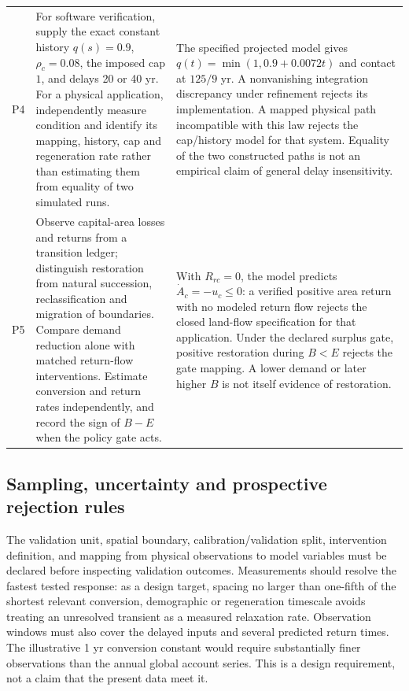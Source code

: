 \documentclass[11pt,a4paper]{article}
\begin{document}
\begin{longtable}{>{\raggedright\arraybackslash}p{}>{\raggedright\arraybackslash}p{}>{\raggedright\arraybackslash}p{}}
\addlinespace
P4 & For software verification, supply the exact constant history $q(s)=0.9$, $\rho_c=0.08$, the imposed cap $1$, and delays 20 or 40 yr. For a physical application, independently measure condition and identify its mapping, history, cap and regeneration rate rather than estimating them from equality of two simulated runs. & The specified projected model gives $q(t)=\min(1,0.9+0.0072t)$ and contact at $125/9$ yr. A nonvanishing integration discrepancy under refinement rejects its implementation. A mapped physical path incompatible with this law rejects the cap/history model for that system. Equality of the two constructed paths is not an empirical claim of general delay insensitivity. \\
\addlinespace
P5 & Observe capital-area losses and returns from a transition ledger; distinguish restoration from natural succession, reclassification and migration of boundaries. Compare demand reduction alone with matched return-flow interventions. Estimate conversion and return rates independently, and record the sign of $B-E$ when the policy gate acts. & With $R_{rc}=0$, the model predicts $\dot A_c=-u_c\le0$: a verified positive area return with no modeled return flow rejects the closed land-flow specification for that application. Under the declared surplus gate, positive restoration during $B<E$ rejects the gate mapping. A lower demand or later higher $B$ is not itself evidence of restoration. \\
\bottomrule
\end{longtable}

\subsection{Sampling, uncertainty and prospective rejection rules}
The validation unit, spatial boundary, calibration/validation split, intervention definition, and mapping from physical observations to model variables must be declared before inspecting validation outcomes. Measurements should resolve the fastest tested response: as a design target, spacing no larger than one-fifth of the shortest relevant conversion, demographic or regeneration timescale avoids treating an unresolved transient as a measured relaxation rate. Observation windows must also cover the delayed inputs and several predicted return times. The illustrative 1 yr conversion constant would require substantially finer observations than the annual global account series. This is a design requirement, not a claim that the present data meet it.
\end{document}
